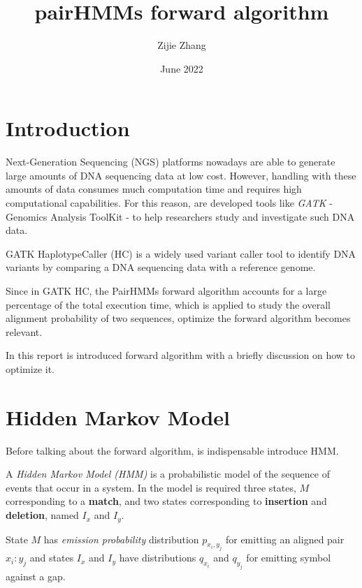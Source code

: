 \documentclass{article}
\title{pairHMMs forward algorithm}
\author{Zijie Zhang}
\date{June 2022}
\begin{document}
\maketitle

\vfill

\tableofcontents

\section{Introduction}

Next-Generation Sequencing (NGS) platforms nowadays are able to generate large amounts of DNA sequencing data at low cost. However, handling with these amounts of data consumes much computation time and requires high computational capabilities. For this reason, are developed tools like \emph{GATK} - Genomics Analysis ToolKit - to help researchers study and investigate such DNA data.

GATK HaplotypeCaller (HC) is a widely used variant caller tool to identify DNA variants by comparing a DNA sequencing data with a reference genome.

Since in GATK HC, the PairHMMs forward algorithm accounts for a large percentage of the total execution time, which is applied to study the overall alignment probability of two sequences, optimize the forward algorithm becomes relevant.

In this report is introduced forward algorithm with a briefly discussion on how to optimize it.

\newpage

\section{Hidden Markov Model}

Before talking about the forward algorithm, is indispensable introduce HMM.

A \emph{Hidden Markov Model (\emph{HMM})} is a probabilistic model of the sequence of events that occur in a system. In the model is required three states, \emph{$M$} corresponding to a \textbf{match}, and two states corresponding to \textbf{insertion} and \textbf{deletion}, named \emph{$I_{x}$} and \emph{$I_{y}$}.

State \emph{$M$} has \emph{emission probability} distribution \emph{$p_{x_i,y_j}$} for emitting an aligned pair $x_{i}:y_{j}$ and states \emph{$I_{x}$} and \emph{$I_{y}$} have distributions $q_{x_i}$ and $q_{y_j}$ for emitting symbol against a gap.
\end{document}
